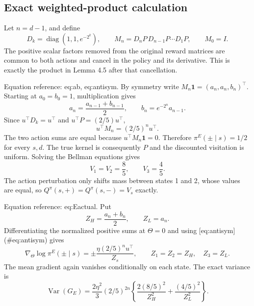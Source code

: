 \documentclass[10pt]{article}
\begin{document}
\subsection*{Exact weighted-product calculation}
Let \(n=d-1\), and define \[D_k=\operatorname{diag}(1,1,e^{-2^k}),\qquad
 M_n=D_nP\,D_{n-1}P\cdots D_1P,\qquad M_0=I.\] The positive scalar factors removed from the original reward matrices are common to both actions and cancel in the policy and its derivative. This is exactly the product in Lemma 4.5 after that cancellation.\par
Equation reference: eq:ab, eq:antisym. By symmetry write \(M_n\mathbf{1}=(a_n,a_n,b_n)^\top\). Starting at \(a_0=b_0=1\), multiplication gives \[
 a_n=\frac{a_{n-1}+b_{n-1}}2,\qquad
 b_n=e^{-2^n}a_{n-1}.\] Since \(u^\top D_k=u^\top\) and \(u^\top P=(2/5)u^\top\), \[
 u^\top M_n=(2/5)^n u^\top.\] The two action sums are equal because \(u^\top M_n\mathbf{1}=0\). Therefore \(\pi^E(\pm\mid s)=1/2\) for every \(s,d\). The true kernel is consequently \(P\) and the discounted visitation is uniform. Solving the Bellman equations gives \[V_1=V_2=\frac85,\qquad V_3=\frac45.\] The action perturbation only shifts mass between states 1 and 2, whose values are equal, so \(Q^\pi(s,+)=Q^\pi(s,-)=V_s\) exactly.\par
Equation reference: eq:Eactual. Put \[Z_H=\frac{a_n+b_n}{2},\qquad Z_L=a_n.\] Differentiating the normalized positive sums at \(\Theta=0\) and using [eq:antisym] (\#eq:antisym) gives \[\nabla_\Theta\log\pi^E(\pm\mid s)
 =\pm\frac{\eta(2/5)^n u^\top}{Z_s},
 \qquad Z_1=Z_2=Z_H,\quad Z_3=Z_L.\] The mean gradient again vanishes conditionally on each state. The exact variance is \[
 \operatorname{Var}(G_E)=
 \frac{2\eta^2}{3}(2/5)^{2n}
 \left\{\frac{2(8/5)^2}{Z_H^2}
                  +\frac{(4/5)^2}{Z_L^2}\right\}.\]\par
\end{document}
